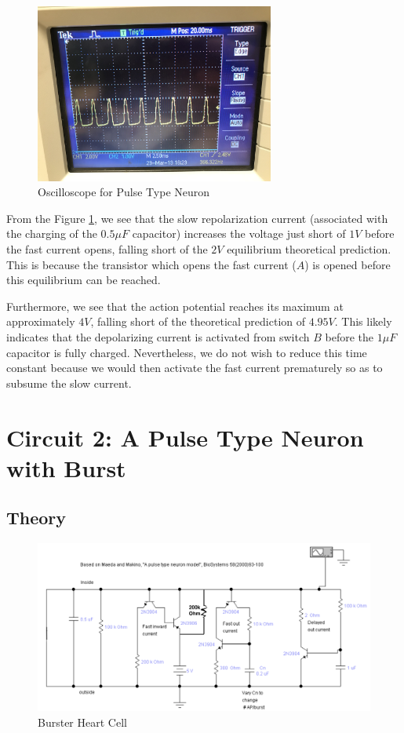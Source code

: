 \documentclass[12]{book}
\newcommand\0{\mathbf{0}}
\newcommand\<{\langle}
\renewcommand\>{\rangle}
\begin{document}
\begin{figure}[H]
\label{fig:pulse}
\centering
\includegraphics[width=0.7\textwidth]{neuron.jpeg}	
\caption{Oscilloscope for Pulse Type Neuron}
\end{figure}

From the Figure \ref{fig:pulse}, we see that the slow repolarization current (associated with the charging of the $0.5 \mu F$ capacitor) increases the voltage just short of $1 V$ before the fast current opens, falling short of the $2V$ equilibrium theoretical prediction. This is because the transistor which opens the fast current ($A$) is opened before this equilibrium can be reached.

Furthermore, we see that the action potential reaches its maximum at approximately $4 V$, falling short of the theoretical prediction of $4.95V$. This likely indicates that the depolarizing current is activated from switch $B$ before the $1 \mu F$ capacitor is fully charged. Nevertheless, we do not wish to reduce this time constant because we would then activate the fast current prematurely so as to subsume the slow current.

\section{Circuit 2: A Pulse Type Neuron with Burst}

\subsection{Theory}

\begin{figure}[H]
\centering
\includegraphics[width=\textwidth]{burster_heart_cell}	
\caption{Burster Heart Cell}
\end{figure}
\end{document}
